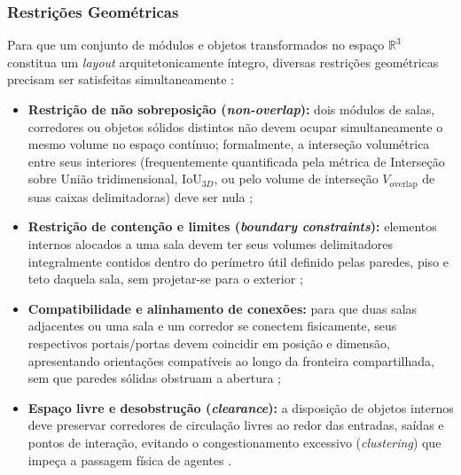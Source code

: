 \subsubsection{Restrições Geométricas}
\label{sec:restricoes_geometricas}

Para que um conjunto de módulos e objetos transformados no espaço $\mathbb{R}^3$ constitua um \textit{layout} arquitetonicamente íntegro, diversas restrições geométricas precisam ser satisfeitas simultaneamente \cite{linden2014dungeons, sun2024roomplanner, xu2025constraint, xu2025databasedrivenframework3dlevel}:
\begin{itemize}
    \item \textbf{Restrição de não sobreposição (\textit{non-overlap}):} dois módulos de salas, corredores ou objetos sólidos distintos não devem ocupar simultaneamente o mesmo volume no espaço contínuo; formalmente, a interseção volumétrica entre seus interiores (frequentemente quantificada pela métrica de Interseção sobre União tridimensional, $\text{IoU}_{3D}$, ou pelo volume de interseção $V_{\text{overlap}}$ de suas caixas delimitadoras) deve ser nula \cite{sun2024roomplanner, xu2025constraint};
    \item \textbf{Restrição de contenção e limites (\textit{boundary constraints}):} elementos internos alocados a uma sala devem ter seus volumes delimitadores integralmente contidos dentro do perímetro útil definido pelas paredes, piso e teto daquela sala, sem projetar-se para o exterior \cite{sun2024roomplanner, xu2025constraint};
    \item \textbf{Compatibilidade e alinhamento de conexões:} para que duas salas adjacentes ou uma sala e um corredor se conectem fisicamente, seus respectivos portais/portas devem coincidir em posição e dimensão, apresentando orientações compatíveis ao longo da fronteira compartilhada, sem que paredes sólidas obstruam a abertura \cite{inproceedings, shaker2016constructive, sun2024roomplanner, xu2025databasedrivenframework3dlevel};
    \item \textbf{Espaço livre e desobstrução (\textit{clearance}):} a disposição de objetos internos deve preservar corredores de circulação livres ao redor das entradas, saídas e pontos de interação, evitando o congestionamento excessivo (\textit{clustering}) que impeça a passagem física de agentes \cite{sun2024roomplanner, xu2025constraint, xu2025databasedrivenframework3dlevel}.
\end{itemize}

